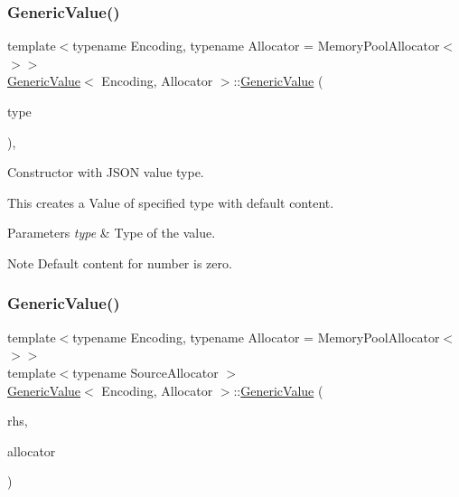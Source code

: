 \subsubsection{\texorpdfstring{Generic\+Value()}{GenericValue()}\hspace{0.1cm}{\footnotesize\ttfamily [1/5]}}
{\footnotesize\ttfamily template$<$typename Encoding, typename Allocator = Memory\+Pool\+Allocator$<$$>$$>$ \\
\hyperlink{a01992}{Generic\+Value}$<$ Encoding, Allocator $>$\+::\hyperlink{a01992}{Generic\+Value} (\begin{DoxyParamCaption}\item[{\hyperlink{a00560_a1d1cfd8ffb84e947f82999c682b666a7}{Type}}]{type }\end{DoxyParamCaption})\hspace{0.3cm}{\ttfamily [inline]}, {\ttfamily [explicit]}}



Constructor with J\+S\+ON value type. 

This creates a Value of specified type with default content. 
\begin{DoxyParams}{Parameters}
{\em type} & Type of the value. \\
\hline
\end{DoxyParams}
\begin{DoxyNote}{Note}
Default content for number is zero. 
\end{DoxyNote}
\mbox{\label{a01992_a5161c0c98ba9144c50a38acde28a5ede}} 
\subsubsection{\texorpdfstring{Generic\+Value()}{GenericValue()}\hspace{0.1cm}{\footnotesize\ttfamily [2/5]}}
{\footnotesize\ttfamily template$<$typename Encoding, typename Allocator = Memory\+Pool\+Allocator$<$$>$$>$ \\
template$<$typename Source\+Allocator $>$ \\
\hyperlink{a01992}{Generic\+Value}$<$ Encoding, Allocator $>$\+::\hyperlink{a01992}{Generic\+Value} (\begin{DoxyParamCaption}\item[{const \hyperlink{a01992}{Generic\+Value}$<$ Encoding, Source\+Allocator $>$ \&}]{rhs,  }\item[{Allocator \&}]{allocator }\end{DoxyParamCaption})\hspace{0.3cm}{\ttfamily [inline]}}



